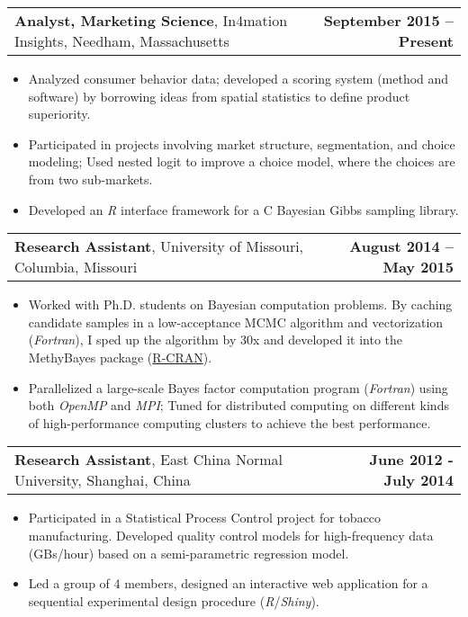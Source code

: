 \documentclass[11pt]{article}
\makeatletter
\newcommand{\headerrow}[2]
{\begin{tabular*}{\linewidth}{l@{\extracolsep{\fill}}r}
	#1 & #2 \\
\end{tabular*}
}
\newcommand{\CPP}
{C\nolinebreak[4]\hspace{0em}\raisebox{.12ex}{\footnotesize\bf ++}}
\makeatother
\begin{document}
\headerrow
{\textbf{Analyst, Marketing Science}, In4mation Insights, Needham, Massachusetts}
{\textbf{September 2015 – Present}}
\begin{itemize}
    \item Analyzed consumer behavior data; developed a scoring system (method and software) by borrowing ideas from spatial statistics to define product superiority.
    \item Participated in projects involving market structure, segmentation, and choice modeling; Used nested logit to improve a choice model, where the choices are from two sub-markets.
    \item Developed an \emph{R} interface framework for a \CPP{} Bayesian Gibbs sampling library.
\end{itemize}



\noindent\headerrow
{\textbf{Research Assistant}, University of Missouri, Columbia, Missouri}
{\textbf{August 2014 – May 2015}}
\noindent\begin{itemize}
    \item Worked with Ph.D. students on Bayesian computation problems. By caching candidate samples in a low-acceptance MCMC algorithm and vectorization (\emph{Fortran}), I sped up the algorithm by 30x and developed it into the MethyBayes package (\href{https://cran.rstudio.com/web/packages/MethyBayes/index.html}{R-CRAN}).
    \item Parallelized a large-scale Bayes factor computation program (\emph{Fortran}) using both \emph{OpenMP} and \emph{MPI}; Tuned for distributed computing on different kinds of high-performance computing clusters to achieve the best performance.
\end{itemize}




\noindent\headerrow
{\textbf{Research Assistant}, East China Normal University, Shanghai, China}
{\textbf{June 2012 - July 2014}}
\noindent\begin{itemize}
    \item Participated in a Statistical Process Control project for tobacco manufacturing.  Developed quality control models for high-frequency data (GBs/hour) based on a semi-parametric regression model.
    \item Led a group of 4 members, designed an interactive web application for a sequential experimental design procedure (\emph{R}/\emph{Shiny}).
\end{itemize}
\end{document}

